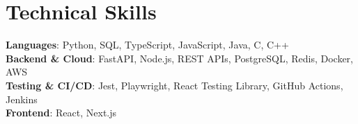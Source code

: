 \section{Technical Skills}
 \begin{itemize}[leftmargin=0.15in, label={}]
    \small{\item{
     \textbf{Languages}{: Python, SQL, TypeScript, JavaScript, Java, C, C++} \\
     \vspace{1pt}
     \textbf{Backend \& Cloud}{: FastAPI, Node.js, REST APIs, PostgreSQL, Redis, Docker, AWS} \\
     \vspace{1pt}
     \textbf{Testing \& CI/CD}{: Jest, Playwright, React Testing Library, GitHub Actions, Jenkins} \\
     \vspace{1pt}
     \textbf{Frontend}{: React, Next.js} \\
    }}
 \end{itemize}
